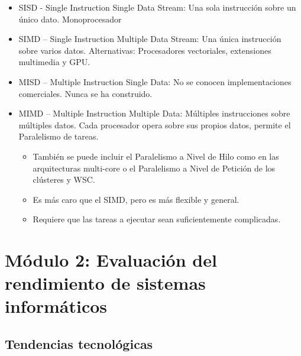 \documentclass[12pt, twoside, openright]{report} %
\begin{document}
\begin{itemize}

	\item SISD - Single Instruction Single Data Stream: Una sola instrucción
	      sobre un único dato. Monoprocesador

	\item SIMD -- Single Instruction Multiple Data Stream: Una única
	      instrucción sobre varios datos. Alternativas: Procesadores vectoriales, extensiones multimedia y
	      GPU.

	\item MISD -- Multiple Instruction Single Data: No se conocen
	      implementaciones comerciales. Nunca se ha construido.
	\item MIMD -- Multiple Instruction Multiple Data: Múltiples instrucciones
	      sobre múltiples datos. Cada procesador opera sobre sus propios
	      datos, permite el Paralelismo de tareas.

	      \begin{itemize}

		      \item También se puede incluir el Paralelismo a Nivel de Hilo como en
		            las arquitecturas multi-core o el Paralelismo a Nivel de Petición
		            de los clústeres y WSC.
		      \item Es más caro que el SIMD, pero es más flexible y general.
		      \item Requiere que las tareas a ejecutar sean suficientemente
		            complicadas.
	      \end{itemize}
\end{itemize}

\chapter{Módulo 2: Evaluación del rendimiento de sistemas informáticos}
\section{Tendencias tecnológicas}
\end{document}
